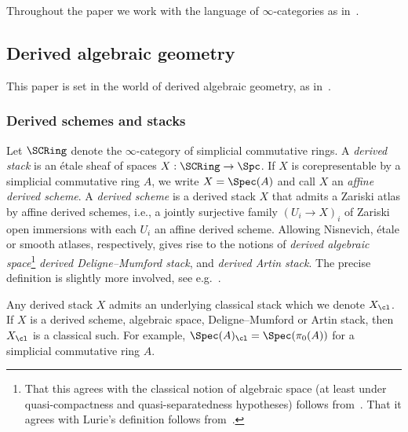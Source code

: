 Throughout the paper we work with the language of $\infty$-categories as in~\cite{HTT,HA-20170918}.

\subsection{Derived algebraic geometry}

This paper is set in the world of derived algebraic geometry, as in~\cite{GaitsgoryRozenblyum,SAG-20180204,HAG2}.

\subsubsection{Derived schemes and stacks}
Let $\SCRing$ denote the $\infty$-category of simplicial commutative rings. A \emph{derived stack} is an étale sheaf of spaces $X : \SCRing \to \Spc$. If $X$ is corepresentable by a simplicial commutative ring $A$, we write $X = \Spec(A)$ and call $X$ an \emph{affine derived scheme}. A \emph{derived scheme} is a derived stack $X$ that admits a Zariski atlas by affine derived schemes, i.e., a jointly surjective family $(U_i \to X)_i$ of Zariski open immersions with each $U_i$ an affine derived scheme. Allowing Nisnevich, étale or smooth atlases, respectively, gives rise to the notions of \emph{derived algebraic space}\footnote{That this agrees with the classical notion of algebraic space (at least under quasi-compactness and quasi-separatedness hypotheses) follows from~\cite[Proposition~5.7.6]{RaynaudGruson}. That it agrees with Lurie's definition follows from~\cite[Example~3.7.1.5]{SAG-20180204}.} \emph{derived Deligne--Mumford stack}, and \emph{derived Artin stack}.
 The precise definition is slightly more involved, see e.g.~\cite[Volume~I, Section~4.1]{GaitsgoryRozenblyum}.

Any derived stack $X$ admits an underlying classical stack which we denote $X_\cl$. If $X$ is a derived scheme, algebraic space, Deligne--Mumford or Artin stack, then $X_\cl$ is a classical such. For example, $\Spec(A)_\cl = \Spec(\pi_0(A))$ for a simplicial commutative ring $A$.

